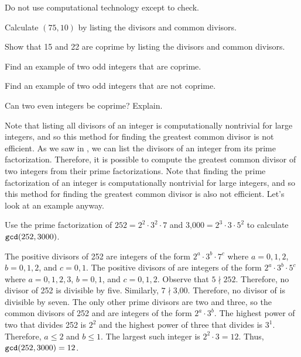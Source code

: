 \begin{act}
\label{act_gcd}
    Do not use computational technology except to check.
        \begin{actpart}
            \item Calculate $(75,10)$ by listing the divisors and common divisors.
            \item Show that 15 and 22 are coprime by listing the divisors and common divisors. 
            \item Find an example of two odd integers that are coprime.
            \item Find an example of two odd integers that are not coprime.
            \item Can two even integers be coprime?  Explain.
        \end{actpart}  
\end{act}

Note that listing all divisors of an integer is computationally nontrivial for large integers, and so this method for finding the greatest common divisor is not efficient.
As we saw in , we can list the divisors of an integer from its prime factorization. Therefore, it is possible to compute the greatest common divisor of two integers from their prime factorizations.  Note that finding the prime factorization of an integer is computationally nontrivial for large integers, and so this method for finding the greatest common divisor is also not efficient.  Let's look at an example anyway.

\begin{exam}
    Use the prime factorization of $252 = 2^2 \cdot 3^2 \cdot 7$ and $\text{3,000} = 2^3 \cdot 3 \cdot 5^2$ to calculate $\texttt{gcd}(252,3000)$.
        \begin{soln}
            The positive divisors of 252 are integers of the form $2^a \cdot 3^b \cdot 7^c$ where $a = 0,1,2$, $b=0,1,2$, and $c=0,1$.  The positive divisors of  are integers of the form $2^a \cdot 3^b \cdot 5^c$ where $a=0,1,2,3$, $b=0,1$, and $c=0,1,2$.  Observe that $5 \nmid 252$.  Therefore, no divisor of 252 is divisible by five.  Similarly, $7 \nmid \text{3,00}$. Therefore, no divisor of  is divisible by seven. The only other prime divisors are two and three, so the common divisors of 252 and  are integers of the form $2^a \cdot 3^b$.  The highest power of two that divides 252 is $2^2$ and the highest power of three that divides  is $3^1$.  Therefore, $a \le 2$ and $b \le 1$. The largest such integer is $2^2 \cdot 3 = 12$. Thus, $\texttt{gcd}(252,3000)=12$.
        \end{soln}
\end{exam}

